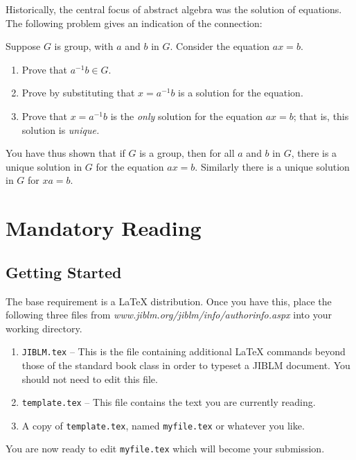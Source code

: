 Historically, the central focus of abstract algebra was the solution of equations. The following problem gives an indication of the connection:

\begin{problem}
Suppose \(G\) is group, with \(a\) and \(b\) in \(G\). Consider the equation \(ax = b\).
\begin{enumerate}
  \item Prove that \(a^{-1}b \in G\).
  \item Prove by substituting that \(x = a^{-1}b\) is a solution for the equation.
  \item Prove that \(x = a^{-1}b\) is the \emph{only} solution for the equation \(ax = b\); that is, this solution is \emph{unique.}
\end{enumerate}
\end{problem}

You have thus shown that if \(G\) is a group, then for all \(a\) and \(b\) in \(G\), there is a unique solution in \(G\) for the equation \(ax = b\). Similarly there is a unique solution in \(G\) for \(xa = b\).

\chapter{Mandatory Reading}

\section{Getting Started}

The base requirement is  a \LaTeX{} distribution. Once you have this, place the following
three files from \emph{www.jiblm.org/jiblm/info/authorinfo.aspx} into your working directory.

\begin{enumerate}
 \item \texttt{JIBLM.tex} -- This is the file containing additional \LaTeX{} commands
       beyond those of the standard book class in order to typeset a JIBLM document.  You should not need
       to edit this file.
 \item \texttt{template.tex} -- This file contains the text you are currently reading.
 \item A copy of \texttt{template.tex}, named \texttt{myfile.tex} or whatever you like.
\end{enumerate}

\noindent
You are now ready to edit \texttt{myfile.tex} which will become your submission.

